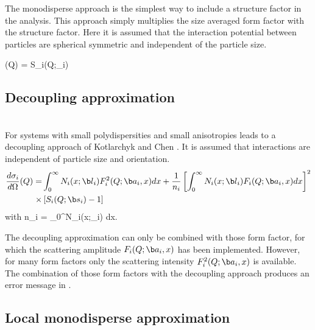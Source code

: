 The monodisperse approach is the simplest way to include a structure factor in the analysis.
This approach simply multiplies the size averaged form factor with the structure factor.
Here it is assumed that the interaction potential between particles are spherical symmetric
and independent of the particle size.

\BE {}(Q) =  S_i(Q;_i)
\EE

\subsection{Decoupling approximation}
\label{sec:SQdecoupling}
~\\

For systems with small polydispersities and small anisotropies leads to a
decoupling approach of Kotlarchyk and Chen \cite{Kotlarchyk1983}. It is assumed that interactions
are independent of particle size and orientation.
\begin{align}
\frac{d\sigma_i}{d\Omega}(Q) = &
\int_0^\infty N_i(x;\B{l}_i) F_i^2(Q;\B{a}_i,x) dx
+  \frac{1}{n_i}\left[\int_0^\infty N_i(x;\B{l}_i)
F_i(Q;\B{a}_i,x) dx\right]^2  \nonumber \\
\times & \left[S_i(Q;\B{s}_i)-1\right]
\end{align}
with
\BE
n_i = \int_0^\infty N_i(x;_i)  dx.
\label{eq:ni}
\EE

The decoupling approximation can only be combined with those form factor,
for which the scattering amplitude $F_i(Q;\B{a}_i,x)$ has been implemented.
However, for many form factors only the scattering intensity $F_i^2(Q;\B{a}_i,x)$ is
available. The combination of those form factors with the decoupling approach produces
an error message in \SASfit.



\subsection{Local monodisperse approximation}
\label{sec:SQlocalmonodisperse}
~\\

